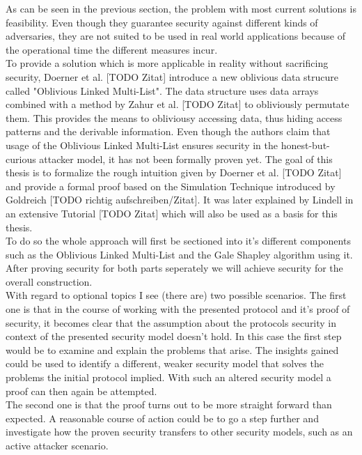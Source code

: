 As can be seen in the previous section, the problem with most current solutions is feasibility. Even though they guarantee security against different kinds of adversaries, they are not suited to be used in real world applications because of the operational time the different measures incur.\\
To provide a solution which is more applicable in reality without sacrificing security, Doerner et al. [TODO Zitat] introduce a new oblivious data strucure called "Oblivious Linked Multi-List". The data structure uses data arrays combined with a method by Zahur et al. [TODO Zitat] to obliviously permutate them. This provides the means to obliviousy accessing data, thus hiding access patterns and the derivable information. Even though the authors claim that usage of the Oblivious Linked Multi-List ensures security in the honest-but-curious attacker model, it has not been formally proven yet. The goal of this thesis is to formalize the rough intuition given by Doerner et al. [TODO Zitat] and provide a formal proof based on the Simulation Technique introduced by Goldreich [TODO richtig aufschreiben/Zitat]. It was later explained by Lindell in an extensive Tutorial [TODO Zitat] which will also be used as a basis for this thesis.\\
To do so the whole approach will first be sectioned into it's different components such as the Oblivious Linked Multi-List and the Gale Shapley algorithm using it. After proving security for both parts seperately we will achieve security for the overall construction.
\ \\With regard to optional topics I see (there are) two possible scenarios. 
The first one is that in the course of working with the presented protocol and it's proof of security, it becomes clear that the assumption about the protocols security in context of the presented security model doesn't hold. In this case the first step would be to examine and explain the problems that arise. The insights gained could be used to identify a different, weaker security model that solves the problems the initial protocol implied. With such an altered security model a proof can then again be attempted.\\
The second one is that the proof turns out to be more straight forward than expected. A reasonable course of action could be to go a step further and investigate how the proven security transfers to other security models, such as an active attacker scenario.